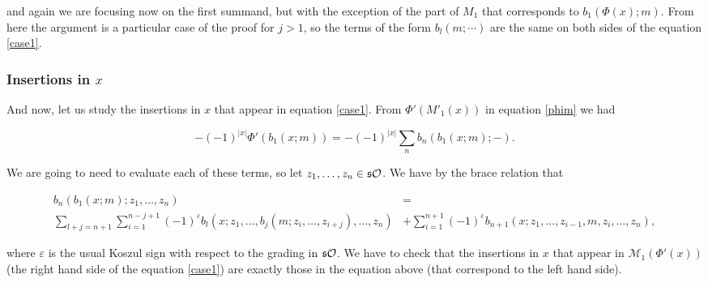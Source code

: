 \documentclass[twoside]{article}
\begin{document}
and again we are focusing now on the first summand, but with the exception of the part of $M_1$ that corresponds to $b_1(\Phi(x);m)$. From here the argument is a particular case of the proof for $j>1$, so the terms of the form $b_l(m;\cdots)$ are the same on both sides of the equation \ref{case1}. 

%
%
%
%


\subsubsection{Insertions in $x$}

And now, let us study the insertions in $x$ that appear in equation \ref{case1}. From $\Phi'(M'_1(x))$ in equation \ref{phim} we had 

\[-(-1)^{|x|}\Phi'(b_1(x;m))=-(-1)^{|x|}\sum_n b_n(b_1(x;m);-).\]

We are going to need to evaluate each of these terms,  so let $z_1,\dots, z_n\in \mathfrak{s}{\mathcal O}$. We have by the brace relation that

\begin{align}\label{insertionx1}
b_n(b_1(x;m);z_1,\dots, z_n)&=\\
 \sum_{l+j=n+1}\sum_{i=1}^{n-j+1}(-1)^{\varepsilon} b_l(x;z_1,\dots,b_j(m;z_{i},\dots, z_{i+j}),\dots, z_n)&+\sum_{i=1}^{n+1}(-1)^{\varepsilon}b_{n+1}(x;z_1,\dots, z_{i-1},m,z_i,\dots, z_n),\nonumber
\end{align}

where $\varepsilon$ is the usual Koszul sign with respect to the grading in $\mathfrak{s}{\mathcal O}$. We have to check that the insertions in $x$ that appear in $\mathcal{M}_1(\Phi'(x))$ (the right hand side of the equation \ref{case1}) are exactly those in the equation above (that correspond to the left hand side).
\end{document}
